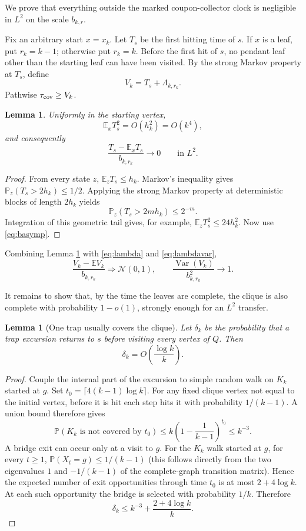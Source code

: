 \documentclass[11pt]{article}
\newtheorem{lemma}[theorem]{Lemma}
\newcommand{\E}{\mathbb E}
\newcommand{\Pp}{\mathbb P}
\newcommand{\Var}{\operatorname{Var}}
\newcommand{\N}{\mathcal N}
\begin{document}
We prove that everything outside the marked coupon-collector clock is negligible
in $L^2$ on the scale $b_{k,r}$.

Fix an arbitrary start $x=x_k$.  Let $T_s$ be the first hitting time of $s$.
If $x$ is a leaf, put $r_k=k-1$; otherwise put $r_k=k$.  Before the first hit
of $s$, no pendant leaf other than the starting leaf can have been visited.
By the strong Markov property at $T_s$, define
\[
 V_k=T_s+\Lambda_{k,r_k}.
\]
Pathwise $\tau_{\rm cov}\ge V_k$.

\begin{lemma}\label{lem:Ts}
Uniformly in the starting vertex,
\[
 \E_x T_s^2=O(h_k^2)=O(k^4),
\]
and consequently
\[
 \frac{T_s-\E_xT_s}{b_{k,r_k}}\longrightarrow0
 \qquad\text{in }L^2.
\]
\end{lemma}

\begin{proof}
From every state $z$, $\E_zT_s\le h_k$.  Markov's inequality gives
$\Pp_z(T_s>2h_k)\le1/2$.  Applying the strong Markov property at deterministic
blocks of length $2h_k$ yields
\[
 \Pp_z(T_s>2mh_k)\le2^{-m}.
\]
Integration of this geometric tail gives, for example,
$\E_zT_s^2\le24h_k^2$.  Now use \eqref{eq:basymp}.
\end{proof}

Combining Lemma \ref{lem:Ts} with \eqref{eq:lambda} and
\eqref{eq:lambdavar},
\begin{equation}\label{eq:Vclt}
 \frac{V_k-\E V_k}{b_{k,r_k}}\Longrightarrow\N(0,1),
 \qquad
 \frac{\Var(V_k)}{b_{k,r_k}^2}\longrightarrow1.
\end{equation}

It remains to show that, by the time the leaves are complete, the clique is
also complete with probability $1-o(1)$, strongly enough for an $L^2$
transfer.

\begin{lemma}[One trap usually covers the clique]\label{lem:trapcovers}
Let $\delta_k$ be the probability that a trap excursion returns to $s$ before
visiting every vertex of $Q$.  Then
\[
 \delta_k=O\!\left(\frac{\log k}{k}\right).
\]
\end{lemma}

\begin{proof}
Couple the internal part of the excursion to simple random walk on $K_k$
started at $g$.  Set
$t_0=\lceil4(k-1)\log k\rceil$.  For any fixed clique vertex not equal to the
initial vertex, before it is hit each step hits it with probability
$1/(k-1)$.  A union bound therefore gives
\[
 \Pp(K_k\text{ is not covered by }t_0)
 \le k\left(1-\frac1{k-1}\right)^{t_0}
 \le k^{-3}.
\]
A bridge exit can occur only at a visit to $g$.  For the $K_k$ walk started at
$g$, for every $t\ge1$,
$\Pp(X_t=g)\le1/(k-1)$ (this follows directly from the two eigenvalues
$1$ and $-1/(k-1)$ of the complete-graph transition matrix).  Hence the
expected number of exit opportunities through time $t_0$ is at most
$2+4\log k$.  At each such opportunity the bridge is selected with probability
$1/k$.  Therefore
\[
 \delta_k\le k^{-3}+\frac{2+4\log k}{k}.
\]
\end{proof}
\end{document}
